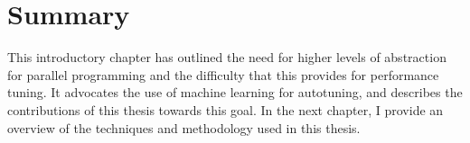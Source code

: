 \section{Summary}

This introductory chapter has outlined the need for higher levels of
abstraction for parallel programming and the difficulty that this
provides for performance tuning. It advocates the use of machine
learning for autotuning, and describes the contributions of this
thesis towards this goal. In the next chapter, I provide an overview
of the techniques and methodology used in this thesis.
